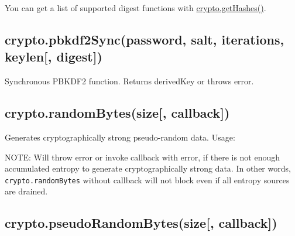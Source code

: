 You can get a list of supported digest functions with
\hyperref[cryptoux5fcryptoux5fgethashes]{crypto.getHashes()}.

\subsection{crypto.pbkdf2Sync(password, salt, iterations, keylen{[},
digest{]})}\label{crypto.pbkdf2syncpassword-salt-iterations-keylen-digest}

Synchronous PBKDF2 function. Returns derivedKey or throws error.

\subsection{crypto.randomBytes(size{[},
callback{]})}\label{crypto.randombytessize-callback}

Generates cryptographically strong pseudo-random data. Usage:

\begin{Shaded}
\end{Shaded}

NOTE: Will throw error or invoke callback with error, if there is not
enough accumulated entropy to generate cryptographically strong data. In
other words, \texttt{crypto.randomBytes} without callback will not block
even if all entropy sources are drained.

\subsection{crypto.pseudoRandomBytes(size{[},
callback{]})}\label{crypto.pseudorandombytessize-callback}

